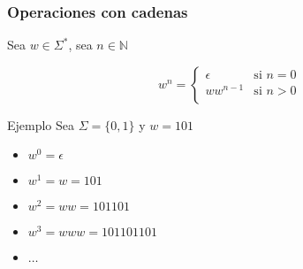 \begin{frame}
  \frametitle{Operaciones con cadenas}
	   Sea $w \in \Sigma^*$, sea $n \in \mathbb{N}$
      \begin{defi}
                   \begin{displaymath}
                   w^n = \left\{ \begin{array}{ll}
                                  \epsilon & \textrm{si $n = 0$} \\
                                  ww^{n-1} & \textrm{si $n > 0$} \\
                                  \end{array} \right.
                   \end{displaymath}
      \end{defi}

      \pause
			\begin{block}{Ejemplo}
			  Sea $\Sigma=\{0, 1\}$ y $w=101$
           \begin{itemize}[<+->]
           \item $w^0 = \epsilon$
           \item $w^1 = w = 101$
           \item $w^2 = ww = 101101$
           \item $w^3 = www = 101101101$
           \item $\ldots$
           \end{itemize}
			\end{block}
\end{frame}
